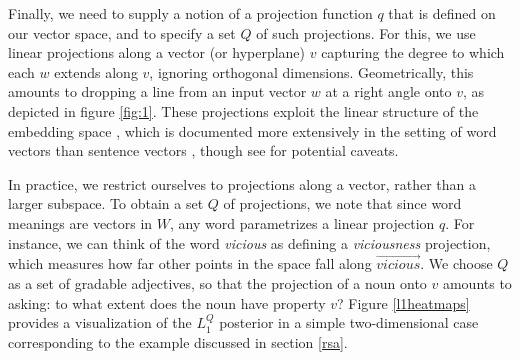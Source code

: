 \documentclass[9pt,twocolumn,twoside,lineno]{pnas-new}
\newcommand{\Listener}{L}
\newcommand{\QLONE}{\Listener_{{1}}^{{Q}}}
\begin{document}
		Finally, we need to supply a notion of a projection function $q$ that is defined on our vector space, and to specify a set $Q$ of such projections. 
		For this, we use linear projections
		along a vector (or hyperplane) $v$ 
		capturing the degree to which each $w$ extends along $v$, ignoring orthogonal dimensions. Geometrically, this amounts to dropping a line from an input vector $w$ at a right angle onto $v$, as depicted in figure \ref{fig:1}. These projections exploit the linear structure of the embedding space \cite{pennington2014glove}, which is documented more extensively in the setting of word vectors than sentence vectors \cite{peters2018deep,devlin2018bert}, though see \cite{linzen2016issues,finley2017analogies} for potential caveats.



		In practice, we restrict ourselves to projections along a vector, rather than a larger subspace. 
		To obtain a set $Q$ of projections, we note that since word meanings are vectors in $W$, any word parametrizes a linear projection $q$. For instance, we can think of the word \emph{vicious} as defining a \emph{viciousness} projection, which measures how far other points in the space fall along $\overrightarrow{\mathit{vicious}}$. 
		We choose $Q$ as a set of gradable adjectives, so that the projection of a noun onto $v$ amounts to asking: to what extent does the noun have property $v$? 
		Figure \ref{l1heatmaps} provides a visualization of the $\QLONE$ posterior in a simple two-dimensional case corresponding to the example discussed in section \ref{rsa}.
\end{document}
